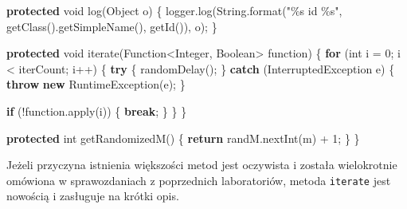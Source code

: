 \documentclass[11pt]{article}
\newenvironment{Shaded}{}{}
\newcommand{\KeywordTok}[1]{\textcolor[rgb]{0.00,0.44,0.13}{\textbf{{#1}}}}
\newcommand{\DataTypeTok}[1]{\textcolor[rgb]{0.56,0.13,0.00}{{#1}}}
\newcommand{\DecValTok}[1]{\textcolor[rgb]{0.25,0.63,0.44}{{#1}}}
\newcommand{\StringTok}[1]{\textcolor[rgb]{0.25,0.44,0.63}{{#1}}}
\newcommand{\FunctionTok}[1]{\textcolor[rgb]{0.02,0.16,0.49}{{#1}}}
\newcommand{\NormalTok}[1]{{#1}}
\newcommand{\SpecialCharTok}[1]{\textcolor[rgb]{0.25,0.44,0.63}{{#1}}}
\newcommand{\ControlFlowTok}[1]{\textcolor[rgb]{0.00,0.44,0.13}{\textbf{{#1}}}}
\newcommand{\OperatorTok}[1]{\textcolor[rgb]{0.40,0.40,0.40}{{#1}}}
\newcommand{\BuiltInTok}[1]{{#1}}
\begin{document}
\begin{Shaded}
\begin{Highlighting}[]
    \KeywordTok{protected} \DataTypeTok{void} \FunctionTok{log}\OperatorTok{(}\BuiltInTok{Object}\NormalTok{ o}\OperatorTok{)} \OperatorTok{\{}
\NormalTok{        logger}\OperatorTok{.}\FunctionTok{log}\OperatorTok{(}\BuiltInTok{String}\OperatorTok{.}\FunctionTok{format}\OperatorTok{(}\StringTok{"}\SpecialCharTok{\%s}\StringTok{ id }\SpecialCharTok{\%s}\StringTok{"}\OperatorTok{,} \FunctionTok{getClass}\OperatorTok{().}\FunctionTok{getSimpleName}\OperatorTok{(),} \FunctionTok{getId}\OperatorTok{()),}\NormalTok{ o}\OperatorTok{);}
    \OperatorTok{\}}

    \KeywordTok{protected} \DataTypeTok{void} \FunctionTok{iterate}\OperatorTok{(}\NormalTok{Function}\OperatorTok{\textless{}}\BuiltInTok{Integer}\OperatorTok{,} \BuiltInTok{Boolean}\OperatorTok{\textgreater{}}\NormalTok{ function}\OperatorTok{)} \OperatorTok{\{}
        \ControlFlowTok{for} \OperatorTok{(}\DataTypeTok{int}\NormalTok{ i }\OperatorTok{=} \DecValTok{0}\OperatorTok{;}\NormalTok{ i }\OperatorTok{\textless{}}\NormalTok{ iterCount}\OperatorTok{;}\NormalTok{ i}\OperatorTok{++)} \OperatorTok{\{}
            \ControlFlowTok{try} \OperatorTok{\{}
                \FunctionTok{randomDelay}\OperatorTok{();}
            \OperatorTok{\}} \ControlFlowTok{catch} \OperatorTok{(}\BuiltInTok{InterruptedException}\NormalTok{ e}\OperatorTok{)} \OperatorTok{\{}
                \ControlFlowTok{throw} \KeywordTok{new} \BuiltInTok{RuntimeException}\OperatorTok{(}\NormalTok{e}\OperatorTok{);}
            \OperatorTok{\}}

            \ControlFlowTok{if} \OperatorTok{(!}\NormalTok{function}\OperatorTok{.}\FunctionTok{apply}\OperatorTok{(}\NormalTok{i}\OperatorTok{))} \OperatorTok{\{}
                \ControlFlowTok{break}\OperatorTok{;}
            \OperatorTok{\}}
        \OperatorTok{\}}
    \OperatorTok{\}}

    \KeywordTok{protected} \DataTypeTok{int} \FunctionTok{getRandomizedM}\OperatorTok{()} \OperatorTok{\{}
        \ControlFlowTok{return}\NormalTok{ randM}\OperatorTok{.}\FunctionTok{nextInt}\OperatorTok{(}\NormalTok{m}\OperatorTok{)} \OperatorTok{+} \DecValTok{1}\OperatorTok{;}
    \OperatorTok{\}}
\OperatorTok{\}}
\end{Highlighting}
\end{Shaded}

Jeżeli przyczyna istnienia większości metod jest oczywista i została
wielokrotnie omówiona w sprawozdaniach z poprzednich laboratoriów,
metoda \texttt{iterate} jest nowością i zasługuje na krótki opis.
\end{document}
